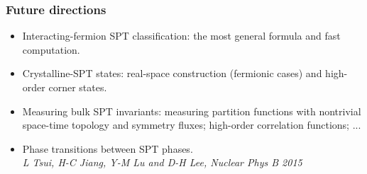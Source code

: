 \documentclass[xcolor=table, aspectratio=169,ignorenonframetext]{beamer}
\begin{document}
\begin{frame}
  \frametitle{Future directions}
  \begin{itemize}
  \item Interacting-fermion SPT classification: the most general formula and fast computation.
  \item Crystalline-SPT states: real-space construction (fermionic cases) and high-order corner states.
  \item Measuring bulk SPT invariants: measuring partition functions with nontrivial space-time topology and symmetry fluxes; high-order correlation functions; ...\\
    \emph{\small}
  \item Phase transitions between SPT phases.\\
    \emph{\small L Tsui, H-C Jiang, Y-M Lu and D-H Lee, Nuclear Phys B 2015}
  \end{itemize}
\end{frame}
\end{document}
